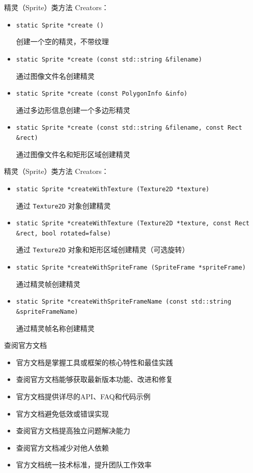 \documentclass{beamer}
\begin{document}
\begin{frame}[fragile]{精灵（Sprite）类方法}
Creators：
\begin{itemize}
\item \texttt{static Sprite *create ()}

创建一个空的精灵，不带纹理
\item \texttt{static Sprite *create (const std::string \&filename)}

通过图像文件名创建精灵
\item \texttt{static Sprite *create (const PolygonInfo \&info)}

通过多边形信息创建一个多边形精灵
\item \texttt{static Sprite *create (const std::string \&filename, const Rect \&rect)}

通过图像文件名和矩形区域创建精灵
\end{itemize}
\end{frame}


\begin{frame}[fragile]{精灵（Sprite）类方法}
Creators：
\begin{itemize}
\item \texttt{static Sprite *createWithTexture (Texture2D *texture)}

通过 \texttt{Texture2D} 对象创建精灵
\item \texttt{static Sprite *createWithTexture (Texture2D *texture, const Rect \&rect, bool rotated=false)}

通过 \texttt{Texture2D} 对象和矩形区域创建精灵（可选旋转）
\item \texttt{static Sprite *createWithSpriteFrame (SpriteFrame *spriteFrame)}

通过精灵帧创建精灵
\item \texttt{static Sprite *createWithSpriteFrameName (const std::string \&spriteFrameName)}

通过精灵帧名称创建精灵
\end{itemize}
\end{frame}


\begin{frame}[fragile]{查阅官方文档}
\begin{itemize}
\item 官方文档是掌握工具或框架的核心特性和最佳实践
\item 查阅官方文档能够获取最新版本功能、改进和修复
\item 官方文档提供详尽的API、FAQ和代码示例
\item 官方文档避免低效或错误实现
\item 查阅官方文档提高独立问题解决能力
\item 查阅官方文档减少对他人依赖
\item 官方文档统一技术标准，提升团队工作效率
\end{itemize}
\end{frame}
\end{document}
